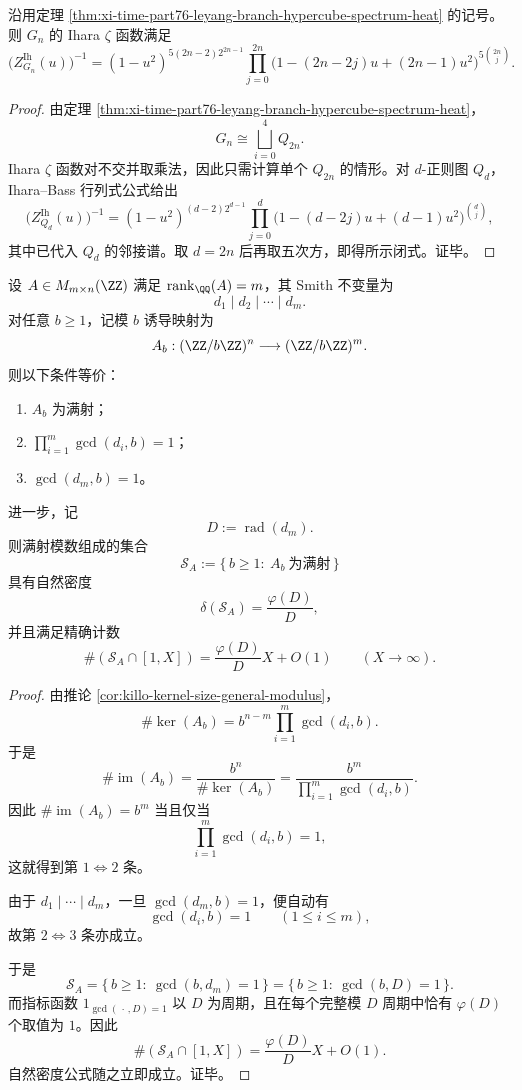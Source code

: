 \begin{corollary}\label{cor:xi-time-part76-leyang-branch-ihara-bass-closed}
沿用定理 \ref{thm:xi-time-part76-leyang-branch-hypercube-spectrum-heat} 的记号。则 \(G_n\) 的 Ihara \(\zeta\) 函数满足
\[
\bigl(Z_{G_n}^{\mathrm{Ih}}(u)\bigr)^{-1}
=
(1-u^2)^{5(2n-2)2^{2n-1}}
\prod_{j=0}^{2n}
\bigl(1-(2n-2j)u+(2n-1)u^2\bigr)^{5\binom{2n}{j}}.
\]
\end{corollary}
\begin{proof}
由定理 \ref{thm:xi-time-part76-leyang-branch-hypercube-spectrum-heat}，
\[
G_n\cong \bigsqcup_{i=0}^{4}Q_{2n}.
\]
Ihara \(\zeta\) 函数对不交并取乘法，因此只需计算单个 \(Q_{2n}\) 的情形。对 \(d\)-正则图 \(Q_d\)，Ihara--Bass 行列式公式给出
\[
\bigl(Z_{Q_d}^{\mathrm{Ih}}(u)\bigr)^{-1}
=(1-u^2)^{(d-2)2^{d-1}}
\prod_{j=0}^{d}
\bigl(1-(d-2j)u+(d-1)u^2\bigr)^{\binom{d}{j}},
\]
其中已代入 \(Q_d\) 的邻接谱。取 \(d=2n\) 后再取五次方，即得所示闭式。证毕。
\end{proof}

\begin{theorem}\label{thm:xi-time-part76-smith-surjective-moduli-prime-sieve}
设 \(A\in M_{m\times n}(\ZZ)\) 满足 \(\operatorname{rank}_{\QQ}(A)=m\)，其 Smith 不变量为
\[
d_1\mid d_2\mid \cdots\mid d_m.
\]
对任意 \(b\ge 1\)，记模 \(b\) 诱导映射为
\[
A_b:(\ZZ/b\ZZ)^n\longrightarrow (\ZZ/b\ZZ)^m.
\]
则以下条件等价：
\begin{enumerate}
  \item \(A_b\) 为满射；
  \item \(\prod_{i=1}^{m}\gcd(d_i,b)=1\)；
  \item \(\gcd(d_m,b)=1\)。
\end{enumerate}
进一步，记
\[
D:=\operatorname{rad}(d_m).
\]
则满射模数组成的集合
\[
\mathcal S_A:=\{\,b\ge 1:\ A_b\ \text{为满射}\,\}
\]
具有自然密度
\[
\delta(\mathcal S_A)=\frac{\varphi(D)}{D},
\]
并且满足精确计数
\[
\#(\mathcal S_A\cap [1,X])
=
\frac{\varphi(D)}{D}X+O(1)
\qquad (X\to\infty).
\]
\end{theorem}
\begin{proof}
由推论 \ref{cor:killo-kernel-size-general-modulus}，
\[
\#\ker(A_b)=b^{n-m}\prod_{i=1}^{m}\gcd(d_i,b).
\]
于是
\[
\#\operatorname{im}(A_b)
=
\frac{b^n}{\#\ker(A_b)}
=
\frac{b^m}{\prod_{i=1}^{m}\gcd(d_i,b)}.
\]
因此 \(\#\operatorname{im}(A_b)=b^m\) 当且仅当
\[
\prod_{i=1}^{m}\gcd(d_i,b)=1,
\]
这就得到第 \(1\iff 2\) 条。

由于 \(d_1\mid \cdots\mid d_m\)，一旦 \(\gcd(d_m,b)=1\)，便自动有
\[
\gcd(d_i,b)=1\qquad(1\le i\le m),
\]
故第 \(2\iff 3\) 条亦成立。

于是
\[
\mathcal S_A=\{\,b\ge 1:\ \gcd(b,d_m)=1\,\}
=
\{\,b\ge 1:\ \gcd(b,D)=1\,\}.
\]
而指标函数 \(1_{\gcd(\,\cdot\,,D)=1}\) 以 \(D\) 为周期，且在每个完整模 \(D\) 周期中恰有 \(\varphi(D)\) 个取值为 \(1\)。因此
\[
\#(\mathcal S_A\cap [1,X])
=
\frac{\varphi(D)}{D}X+O(1).
\]
自然密度公式随之立即成立。证毕。
\end{proof}

